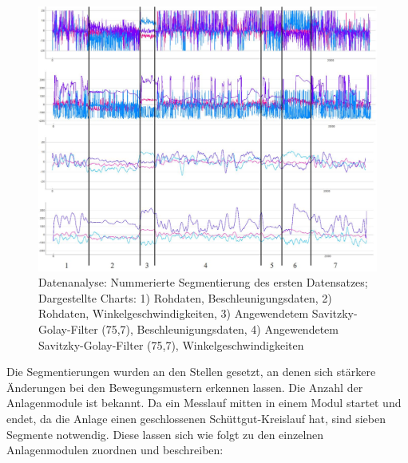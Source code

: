 \begin{figure}[htb]
	\centering
	\includegraphics[width=1\linewidth]{images/k5-segmentierung.JPG}
	\caption{Datenanalyse: Nummerierte Segmentierung des ersten Datensatzes; Dargestellte Charts: 1) Rohdaten, Beschleunigungsdaten, 2) Rohdaten, Winkelgeschwindigkeiten, 3) Angewendetem Savitzky-Golay-Filter (75,7), Beschleunigungsdaten, 4) Angewendetem Savitzky-Golay-Filter (75,7), Winkelgeschwindigkeiten}
	\label{fig:k5_segmentierung}
\end{figure}

Die Segmentierungen wurden an den Stellen gesetzt, an denen sich stärkere Änderungen bei den Bewegungsmustern erkennen lassen. Die Anzahl der Anlagenmodule ist bekannt. Da ein Messlauf mitten in einem Modul startet und endet, da die Anlage einen geschlossenen Schüttgut-Kreislauf hat, sind sieben Segmente notwendig. Diese lassen sich wie folgt zu den einzelnen Anlagenmodulen zuordnen und beschreiben:

